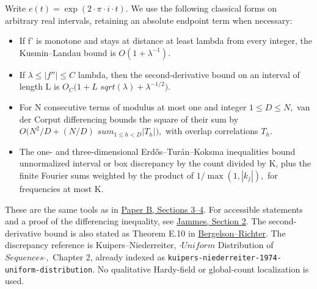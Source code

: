\documentclass[11pt,a4paper]{article}
\providecommand{\tightlist}{\setlength{\itemsep}{0pt}\setlength{\parskip}{0pt}}
\begin{document}
Write \(e(t)=\exp(2\cdot \pi\cdot i\cdot t).\) We use the following
classical forms on arbitrary real intervals, retaining an absolute
endpoint term when necessary:

\begin{itemize}
\tightlist
\item
  If f' is monotone and stays at distance at least lambda from every
  integer, the Kusmin--Landau bound is \(O(1+\lambda^{-1}).\)
\item
  If \(\lambda\le |f''|\le C\) lambda, then the second-derivative bound
  on an interval of length L is \(O_C(1+L\)
  \(sqrt(\lambda)+\lambda^{-1/2}).\)
\item
  For N consecutive terms of modulus at most one and integer
  \(1\le D\le N,\) van der Corput differencing bounds the square of
  their sum by \(O(N^2/D+(N/D)\) \(sum_{1\le h<D}|T_h|),\) with overlap
  correlations \(T_h.\)
\item
  The one- and three-dimensional Erd\H{o}s--Tur\'{a}n--Koksma
  inequalities bound unnormalized interval or box discrepancy by the
  count divided by K, plus the finite Fourier sums weighted by the
  product of \(1/\max(1,|k_j|),\) for frequencies at most K.
\end{itemize}

These are the same tools as in
\href{https://github.com/sneakyweasel/btlab/blob/main/docs/theory/juggler_parity_discrepancy_note.md}{Paper
B, Sections 3--4}. For accessible statements and a proof of the
differencing inequality, see
\href{https://math.univ-cotedazur.fr/~pjammes/publications/diviseurs95.pdf}{Jammes,
Section 2}. The second-derivative bound is also stated as Theorem E.10
in
\href{https://people.math.osu.edu/bergelson.1/BR_DensityCoprime.pdf}{Bergelson--Richter}.
The discrepancy reference is Kuipers--Niederreiter, \(\cdot Uniform\)
Distribution of \(Sequences\cdot ,\) Chapter 2, already indexed as
\texttt{\nolinkurl{kuipers-niederreiter-1974-uniform-distribution}}. No
qualitative Hardy-field or global-count localization is used.
\end{document}
